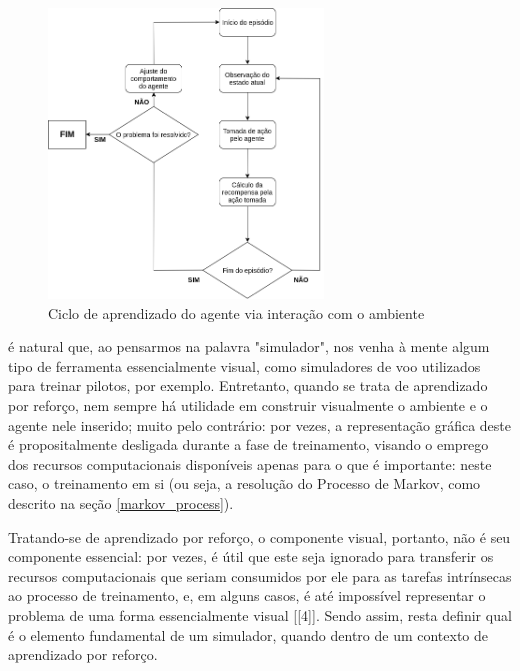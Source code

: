 \documentclass[cic,tc]{iiufrgs}
\begin{document}
\begin{figure}
    \caption{Ciclo de aprendizado do agente via interação com o ambiente}
    \begin{center}
      \includegraphics[width=0.65\textwidth]{fluxo_ar.png}
    \end{center}
    \label{fig:fluxo_ar2}
\end{figure}

é natural que, ao pensarmos na palavra "simulador", nos venha à mente algum tipo
de ferramenta essencialmente visual, como simuladores de voo utilizados para
treinar pilotos, por exemplo. Entretanto, quando se trata de aprendizado por
reforço, nem sempre há utilidade em construir visualmente o ambiente e o agente
nele inserido; muito pelo contrário: por vezes, a representação gráfica deste é
propositalmente desligada durante a fase de treinamento, visando o emprego dos
recursos computacionais disponíveis apenas para o que é importante: neste caso,
o treinamento em si (ou seja, a resolução do Processo de Markov, como descrito
na seção \ref{markov_process}).


Tratando-se de aprendizado por reforço, o componente visual, portanto, não é
seu componente essencial: por vezes, é útil que este seja ignorado para
transferir os recursos computacionais que seriam consumidos por ele para as
tarefas intrínsecas ao processo de treinamento, e, em alguns casos, é até
impossível representar o problema de uma forma essencialmente visual [[4]].
Sendo assim, resta definir qual é o elemento fundamental de um simulador, quando
dentro de um contexto de aprendizado por reforço.
\end{document}
